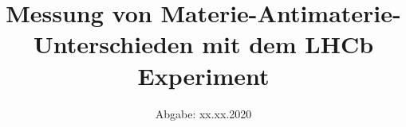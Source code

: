 

\subject{Praktikumsversuch im SS2020}
\title{Messung von Materie-Antimaterie-Unterschieden mit dem LHCb Experiment}
\date{%
  Abgabe: xx.xx.2020
}



\maketitle
\thispagestyle{empty}
\tableofcontents
\newpage









